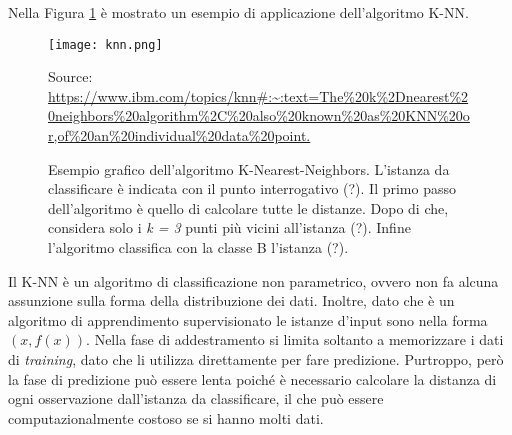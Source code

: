 Nella Figura \ref{fig:knn} è mostrato un esempio di applicazione dell'algoritmo K-NN.\\
\begin{figure}[h]
	\begin{center}
		\texttt{[image: knn.png]}
		\caption{Esempio grafico dell'algoritmo K-Nearest-Neighbors.
			L'istanza da classificare è indicata con il punto interrogativo (?).
			Il primo passo dell'algoritmo è quello di calcolare tutte le distanze. Dopo di che, considera solo i \emph{k = 3} punti più vicini all'istanza (?). Infine l'algoritmo classifica con la classe B l'istanza (?).
		} 
		Source: \url{https://www.ibm.com/topics/knn#:~:text=The%20k%2Dnearest%20neighbors%20algorithm%2C%20also%20known%20as%20KNN%20or,of%20an%20individual%20data%20point.}\label{fig:knn}
	\end{center}
\end{figure}

Il K-NN è un algoritmo di classificazione non parametrico, ovvero non fa alcuna assunzione sulla forma della distribuzione dei dati. Inoltre, dato che è un algoritmo di apprendimento supervisionato le istanze d'input sono nella forma $(x, f(x))$. Nella fase di 
addestramento si limita soltanto a memorizzare i dati di \emph{training}, dato che li utilizza direttamente per fare predizione. Purtroppo, però la fase di predizione può essere lenta poiché è necessario calcolare la distanza di ogni osservazione dall'istanza da classificare, il che può essere computazionalmente costoso se si hanno molti dati.


